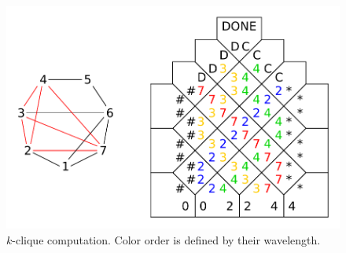 \begin{figure}[H]
\begin{center}
	\includegraphics[scale=0.75]{./figures/k-clique/k-clique.pdf}
	\caption{$k$-clique computation. Color order is defined by their wavelength.}
	\label{fig:k-clique}
\end{center}
\end{figure}

